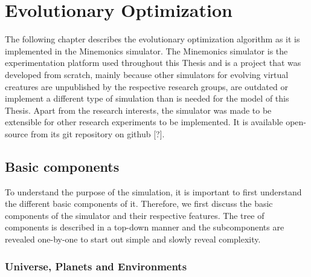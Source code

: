 \documentclass[main]{subfiles}
\begin{document}
\setcounter{chapter}{1}

\chapter{Evolutionary Optimization} %

\label{Chapter\thechapter} %


The following chapter describes the evolutionary optimization algorithm as it is implemented in the Minemonics simulator. The Minemonics simulator is the experimentation platform used throughout this Thesis and is a project that was developed from scratch, mainly because other simulators for evolving virtual creatures are unpublished by the respective research groups, are outdated or implement a different type of simulation than is needed for the model of this Thesis. Apart from the research interests, the simulator was made to be extensible for other research experiments to be implemented. It is available open-source from its git repository on github [?].

\section{Basic components}

To understand the purpose of the simulation, it is important to first understand the different basic components of it. Therefore, we first discuss the basic components of the simulator and their respective features. The tree of components is described in a top-down manner and the subcomponents are revealed one-by-one to start out simple and slowly reveal complexity. 

\subsection{Universe, Planets and Environments}
\end{document}
